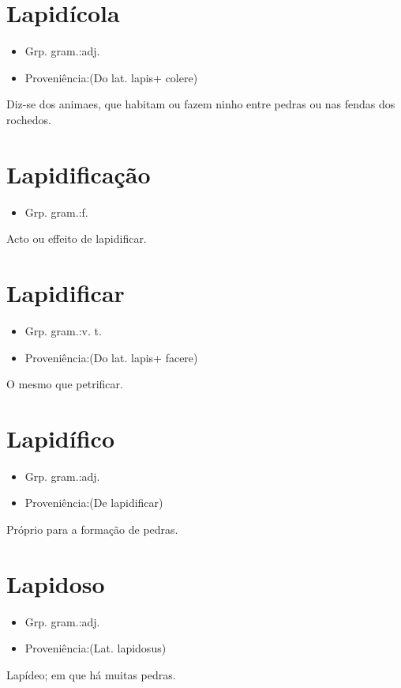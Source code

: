 \section{Lapidícola}
\begin{itemize}
\item {Grp. gram.:adj.}
\end{itemize}
\begin{itemize}
\item {Proveniência:(Do lat. \textunderscore lapis\textunderscore  + \textunderscore colere\textunderscore )}
\end{itemize}
Diz-se dos animaes, que habitam ou fazem ninho entre pedras ou nas fendas dos rochedos.
\section{Lapidificação}
\begin{itemize}
\item {Grp. gram.:f.}
\end{itemize}
Acto ou effeito de \textunderscore lapidificar\textunderscore .
\section{Lapidificar}
\begin{itemize}
\item {Grp. gram.:v. t.}
\end{itemize}
\begin{itemize}
\item {Proveniência:(Do lat. \textunderscore lapis\textunderscore  + \textunderscore facere\textunderscore )}
\end{itemize}
O mesmo que \textunderscore petrificar\textunderscore .
\section{Lapidífico}
\begin{itemize}
\item {Grp. gram.:adj.}
\end{itemize}
\begin{itemize}
\item {Proveniência:(De \textunderscore lapidificar\textunderscore )}
\end{itemize}
Próprio para a formação de pedras.
\section{Lapidoso}
\begin{itemize}
\item {Grp. gram.:adj.}
\end{itemize}
\begin{itemize}
\item {Proveniência:(Lat. \textunderscore lapidosus\textunderscore )}
\end{itemize}
Lapídeo; em que há muitas pedras.
